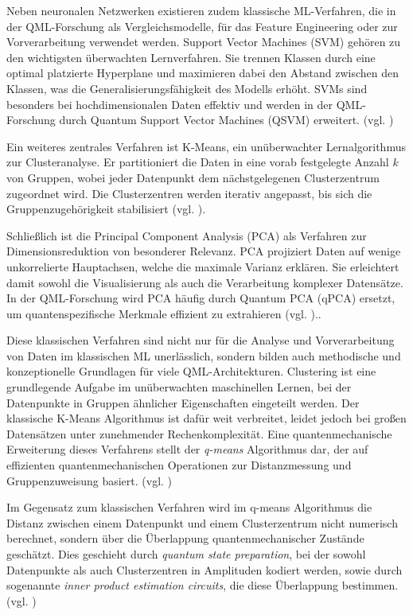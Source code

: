 Neben neuronalen Netzwerken existieren zudem klassische ML-Verfahren, die in der QML-Forschung als Vergleichsmodelle, für das Feature Engineering oder zur Vorverarbeitung verwendet werden. Support Vector Machines (SVM) gehören zu den wichtigsten überwachten Lernverfahren. Sie trennen Klassen durch eine optimal platzierte Hyperplane und maximieren dabei den Abstand zwischen den Klassen, was die Generalisierungsfähigkeit des Modells erhöht. SVMs sind besonders bei hochdimensionalen Daten effektiv und werden in der QML-Forschung durch Quantum Support Vector Machines (QSVM) erweitert. (vgl. \cite{janiesch_machine_2021})

Ein weiteres zentrales Verfahren ist K-Means, ein unüberwachter Lernalgorithmus zur Clusteranalyse. Er partitioniert die Daten in eine vorab festgelegte Anzahl $k$ von Gruppen, wobei jeder Datenpunkt dem nächstgelegenen Clusterzentrum zugeordnet wird. Die Clusterzentren werden iterativ angepasst, bis sich die Gruppenzugehörigkeit stabilisiert (vgl. \cite{janiesch_machine_2021}).

Schließlich ist die Principal Component Analysis (PCA) als Verfahren zur Dimensionsreduktion von besonderer Relevanz. PCA projiziert Daten auf wenige unkorrelierte Hauptachsen, welche die maximale Varianz erklären. Sie erleichtert damit sowohl die Visualisierung als auch die Verarbeitung komplexer Datensätze. In der QML-Forschung wird PCA häufig durch Quantum PCA (qPCA) ersetzt, um quantenspezifische Merkmale effizient zu extrahieren (vgl. \cite{janiesch_machine_2021})..

Diese klassischen Verfahren sind nicht nur für die Analyse und Vorverarbeitung von Daten im klassischen ML unerlässlich, sondern bilden auch methodische und konzeptionelle Grundlagen für viele QML-Architekturen. Clustering ist eine grundlegende Aufgabe im unüberwachten maschinellen Lernen, bei der Datenpunkte in Gruppen ähnlicher Eigenschaften eingeteilt werden. Der klassische K-Means Algorithmus ist dafür weit verbreitet, leidet jedoch bei großen Datensätzen unter zunehmender Rechenkomplexität. Eine quantenmechanische Erweiterung dieses Verfahrens stellt der \textit{q-means} Algorithmus dar, der auf effizienten quantenmechanischen Operationen zur Distanzmessung und Gruppenzuweisung basiert. (vgl. \cite{kerenidis_q-means_2019})

Im Gegensatz zum klassischen Verfahren wird im q-means Algorithmus die Distanz zwischen einem Datenpunkt und einem Clusterzentrum nicht numerisch berechnet, sondern über die Überlappung quantenmechanischer Zustände geschätzt. Dies geschieht durch \textit{quantum state preparation}, bei der sowohl Datenpunkte als auch Clusterzentren in Amplituden kodiert werden, sowie durch sogenannte \textit{inner product estimation circuits}, die diese Überlappung bestimmen. (vgl. \cite{kerenidis_q-means_2019})

